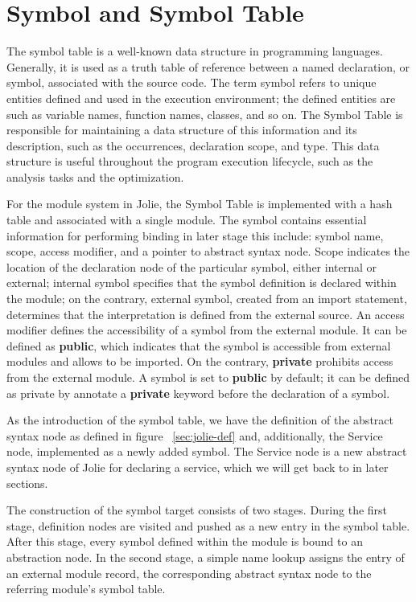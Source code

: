 
\section{Symbol and Symbol Table}

The symbol table is a well-known data structure in programming languages. Generally, it is used as a truth table of reference between a named declaration, or symbol, associated with the source code. The term symbol refers to unique entities defined and used in the execution environment; the defined entities are such as variable names, function names, classes, and so on.
The Symbol Table is responsible for maintaining a data structure of this information and its description, such as the occurrences, declaration scope, and type. This data structure is useful throughout the program execution lifecycle, such as the analysis tasks and the optimization.

For the module system in Jolie, the Symbol Table is implemented with a hash table and associated with a single module.
The symbol contains essential information for performing binding in later stage this include: symbol name, scope, access modifier, and a pointer to abstract syntax node.
Scope indicates the location of the declaration node of the particular symbol, either internal or external; internal symbol specifies that the symbol definition is declared within the module; on the contrary, external symbol, created from an import statement, determines that the interpretation is defined from the external source.
An access modifier defines the accessibility of a symbol from the external module. It can be defined as \textbf{public}, which indicates that the symbol is accessible from external modules and allows to be imported. On the contrary, \textbf{private} prohibits access from the external module. A symbol is set to \textbf{public} by default; it can be defined as private by annotate a \textbf{private} keyword before the declaration of a symbol.

As the introduction of the symbol table, we have the definition of the abstract syntax node as defined in figure ~\ref{sec:jolie-def} and, additionally, the Service node, implemented as a newly added symbol. The Service node is a new abstract syntax node of Jolie for declaring a service, which we will get back to in later sections.

The construction of the symbol target consists of two stages. During the first stage, definition nodes are visited and pushed as a new entry in the symbol table. After this stage, every symbol defined within the module is bound to an abstraction node. In the second stage, a simple name lookup assigns the entry of an external module record, the corresponding abstract syntax node to the referring module's symbol table.

